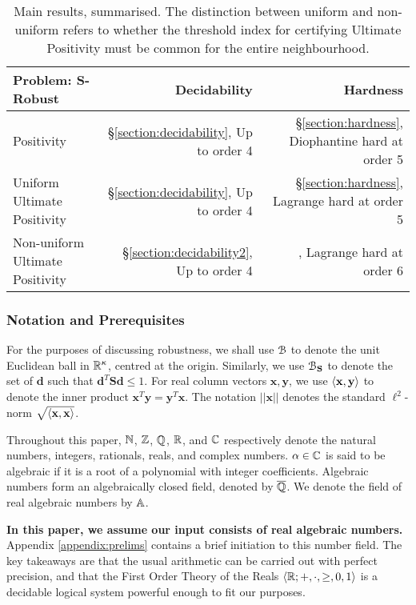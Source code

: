 \begin{table}[H]
\begin{tabular}{|l|r|r|}
  \hline
   \textbf{Problem:} $\mathbf{S}$-\textbf{Robust}& \textbf{Decidability }& {\bf Hardness} \\
  \hline
  Positivity & \S\ref{section:decidability}, Up to order 4 & \S\ref{section:hardness}, Diophantine hard at order 5\\
  Uniform Ultimate Positivity & \S\ref{section:decidability}, Up to order 4 & \S\ref{section:hardness}, Lagrange hard at order 5 \\
  Non-uniform Ultimate Positivity & \S\ref{section:decidability2}, Up to order 4 & \cite{joeljames3,originalarxiv}, Lagrange hard at order 6 
  \\
  \hline
\end{tabular}

\caption{Main results, summarised. The distinction between uniform and non-uniform refers to whether the threshold index for certifying Ultimate Positivity must be common for the entire neighbourhood.}%
  \label{tab:results}
\end{table}

\subsubsection*{Notation and Prerequisites}
For the purposes of discussing robustness, we shall use $\mathcal{B}$ to denote the unit Euclidean ball in $\mathbb{R}^\kappa$, centred at the origin. Similarly, we use $\mathcal{B}_{\mathbf{S}}$ to denote the set of $\mathbf{d}$ such that $\mathbf{d}^T\mathbf{Sd} \le 1$. For real column vectors $\mathbf{x}, \mathbf{y}$, we use $\langle\mathbf{x}, \mathbf{y}\rangle$ to denote the inner product $\mathbf{x}^T\mathbf{y} = \mathbf{y}^T\mathbf{x}$. The notation $||\mathbf{x}||$ denotes the standard $\ell^2$-norm $\sqrt{\langle\mathbf{x}, \mathbf{x}\rangle}$.

Throughout this paper,  $\mathbb{N}$, $\mathbb{Z}$, $\mathbb{Q}$, $\mathbb{R}$, and $\mathbb{C}$ respectively denote the natural numbers, integers, rationals, reals, and complex numbers. $\alpha \in \mathbb{C}$ is said to be algebraic if it is a root of a polynomial with integer coefficients. Algebraic numbers form an algebraically closed field, denoted by $\overline{\mathbb{Q}}$. We denote the field of real algebraic numbers by $\mathbb{A}$.

\textbf{In this paper, we assume our input consists of real algebraic numbers.} Appendix \ref{appendix:prelims} contains a brief initiation to this number field. The key takeaways are that the usual arithmetic can be carried out with perfect precision, and that the First Order Theory of the Reals $\langle\mathbb{R}; +, \cdot, \ge, 0, 1\rangle$ is a decidable logical system powerful enough to fit our purposes.

